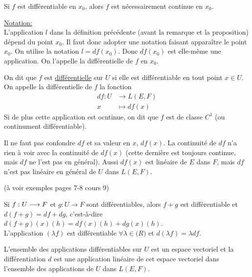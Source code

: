 \documentclass[12pt,a4paper]{article}
\begin{document}
\begin{flushleft}
\begin{prop}
Si $f$ est différentiable en $x_0$, alors $f$ est nécessairement continue en $x_0$.
\end{prop}

\underline{Notation:}\\
L'application $l$ dans la définition précédente (avant la remarque et la proposition) dépend du point $x_0$. Il faut donc adopter une notation faisant apparaître le point $x_0$. On utilise la notation $l = df(x_0)$. Donc $df(x_0)$ est elle-même une application. On l'appelle la différentielle de $f$ en $x_0$.

\begin{mydef}
On dit que $f$ est \underline{différentielle} sur $U$ si elle est différentiable en tout point $x \in U$. On appelle la différentielle de $f$ la fonction
\begin{align*}
df : U & \longrightarrow L(E,F)\\
      x	& \longmapsto df(x)
\end{align*}
Si de plus cette application est ocntinue, on dit que $f$ est de classe $C^1$ (ou continument différentiable).
\end{mydef}

\begin{rem}
Il ne faut pas confondre $df$ et sa valeur en $x$, $df(x)$. La continuité de $df$ n'a rien à voir avec la continuité de $df(x)$ (cette dernière est toujours continue, mais $df$ ne l'est pas en général). Aussi $df(x)$ est linéaire de $E$ dans $F$, mais $df$ n'est pas linéaire en général de $U$ dans $L(E,F)$.
\end{rem}

(à voir exemples pages 7-8 cours 9)\\

\begin{thm}
Si $\textit{$f:U \longrightarrow F$}$ et $g: U \longrightarrow F$ sont différentiables, alors $f+g $ est différentiable et $d(f+g) = df + dg$, c'est-à-dire $d(f+g)(x)(h) = df(x)(h) + dg(x)(h)$.\\L'application $( \lambda f )$ est différentiable $\forall \lambda \in \mathbb(R)$ et $d( \lambda f) = \lambda df$.
\end{thm}

\begin{rem}
L'ensemble des applications différentiables sur $U$ est un espace vectoriel et la différentiation $d$ est une application linéaire de cet espace vectoriel dans l'ensemble des applications de $U$ dans $L(E,F)$.
\end{rem}


\end{flushleft}
\end{document}
